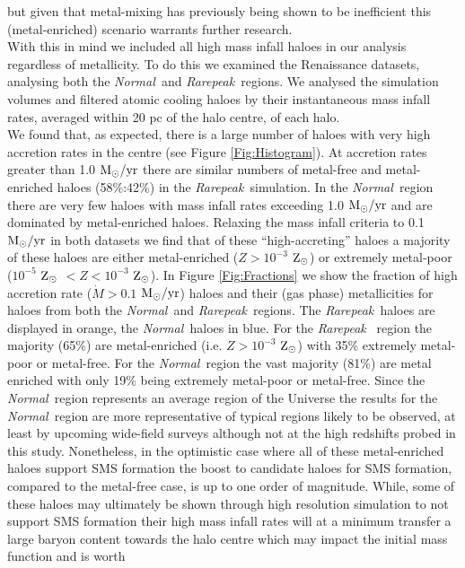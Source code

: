 \documentclass[graphics, twocolumn, usenatbib]{mn2e}
\newcommand{\msolaryr} {$\rm{M_{\odot}/yr}~$}
\newcommand{\msolaryrc} {$\rm{M_{\odot}/yr}$}
\newcommand{\zsolar} {$\rm{Z_{\odot}}~$}
\newcommand{\zsolarc} {$\rm{Z_{\odot}}$}
\newcommand{\rarepeak} {\textit{Rarepeak~}}
\newcommand{\normal} {\textit{Normal~}}
\begin{document}
but given that metal-mixing has previously being shown to be inefficient
\citep[e.g.][]{Smith_2015} this (metal-enriched) scenario warrants further research. \\
\indent With this in mind we included all high mass infall haloes in our analysis regardless of
metallicity. To do this we examined the Renaissance datasets, analysing
both the \normal and \rarepeak regions. We analysed the simulation volumes and filtered atomic
cooling haloes by their instantaneous mass infall rates, averaged within 20 pc of the halo centre,
of each halo.  \\
\indent We found that, as expected, there is a large number of haloes with very high accretion rates
in the centre (see Figure \ref{Fig:Histogram}). At accretion rates
greater than 1.0 \msolaryr there are similar numbers of metal-free and metal-enriched haloes
(58\%:42\%) in the \rarepeak simulation. In the \normal region there are very few haloes with mass
infall rates exceeding 1.0 \msolaryr and are dominated by metal-enriched haloes. Relaxing the
mass infall criteria to 0.1 \msolaryr in both datasets we find that of these ``high-accreting''
haloes a majority of these haloes are either metal-enriched ($Z > 10^{-3}$ \zsolarc) or
extremely metal-poor ($10^{-5}$ \zsolar $ < Z < 10^{-3}$ \zsolarc). In Figure \ref{Fig:Fractions}
we show the fraction of high accretion rate ($\dot{M} > 0.1$ \msolaryrc) haloes and
their (gas phase) metallicities for haloes from both the \normal and \rarepeak regions.
The \rarepeak haloes are displayed in orange, the \normal haloes in blue. For the \rarepeak
region the majority (65\%) are metal-enriched (i.e. $Z > 10^{-3}$ \zsolarc) with 35\% extremely
metal-poor or metal-free. For the \normal region the vast
majority (81\%) are metal enriched with only 19\% being extremely metal-poor or metal-free.
Since the \normal region represents an average
region of the Universe the results for the \normal region are more representative of typical
regions likely to be observed, at least by upcoming wide-field surveys although not at the high
redshifts probed in this study. Nonetheless, 
in the optimistic case where all of these metal-enriched haloes support SMS formation the boost to
candidate haloes for SMS formation, compared to the metal-free case, is up to one order of
magnitude. While, some of these haloes may ultimately be shown through high resolution simulation
to not support SMS formation their high mass infall rates will at a minimum transfer a large
baryon content towards the halo centre which may impact the initial mass function and is worth
\end{document}
